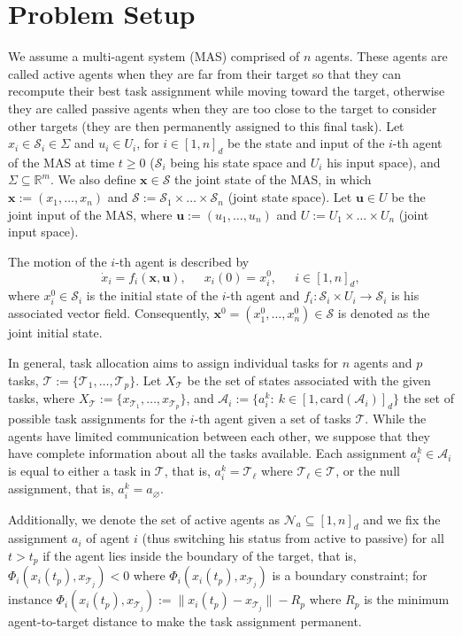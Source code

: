 \documentclass{ifacconf}
\newcommand{\cA}{\mathcal{A}}
\newcommand{\cN}{\mathcal{N}}
\newcommand{\cS}{\mathcal{S}}
\newcommand{\cT}{\mathcal{T}}
\begin{document}
\section{Problem Setup}\label{s:prelim}

We assume a multi-agent system (MAS) comprised of $n$ agents. These agents are called active agents when they are far from their target so that they can recompute their best task assignment while moving toward the target, otherwise they are called passive agents when they are too close to the target to consider other targets (they are then permanently assigned to this final task). Let $x_i \in \cS_i \in \Sigma$ and $u_i \in U_i$, for $i \in [1,n]_d$ be the state and input of the $i$-th agent of the MAS at time $t\geq 0$ ($\cS_i$ being his state space and $U_i$ his input space), and $\Sigma \subseteq \mathbb{R}^m$. We also define $\bm{x} \in \cS$ the joint state of the MAS, in which $\bm{x} := (x_1,\dots,x_n)$ and $\cS:= \cS_1 \times \dots \times \cS_n$ (joint state space). Let $\bm{u} \in U$ be the joint input of the MAS, where $\bm{u} := (u_1, \dots, u_n)$ and $U:= U_1 \times \dots \times U_n$ (joint input space). 

The motion of the $i$-th agent is described by
\begin{equation}\label{eq:motion1}
\dot{x}_i = f_i(\bm{x}, \bm{u}),~\quad~x_i(0)=x_i^0,~\quad~i \in [1, n]_d,
\end{equation}
where $x^0_i \in \cS_i$ is the initial state of the $i$-th agent and $f_i: \cS_i \times U_i \rightarrow \cS_i$ is his associated vector field. 
Consequently, $\bm{x}^0 = (x^0_1, \dots, x^0_n) \in \cS$ is denoted as the joint initial state.




In general, task allocation aims to assign individual tasks for $n$ agents and $p$ tasks, $\cT := \{ \cT_1, \dots, \cT_p\}$. 
Let $X_{\cT}$ be the set of states associated with the given tasks, where $X_{\cT} := \{ x_{\cT_1}, \dots, x_{\cT_p} \}$,
and $\cA_i:= \{ a_i^k:~k\in[1,\mathrm{card}( \cA_i )]_d \}$ the set of possible task assignments for the $i$-th agent given a set of tasks $\cT$. While the agents have limited communication between each other, we suppose that they have complete information about all the tasks available.
Each assignment $a_i^k \in \cA_i$ is equal to either a task in $\cT$, that is, $a_i^k = \cT_\ell$ where $\cT_\ell \in \cT$, or the null assignment, that is, $a_i^k = a_\varnothing$.

Additionally, we denote the set of active agents as $\cN_a \subseteq [1,n]_d$ and we fix the assignment $a_i$ of agent $i$ (thus switching his status from active to passive) for all $t > t_p$ if the agent lies inside the boundary of the target, that is, $\Phi_i( x_i(t_p), x_{\cT_j}) < 0$ where $\Phi_i( x_i(t_p), x_{\cT_j})$ is a boundary constraint; for instance $\Phi_i( x_i(t_p), x_{\cT_j}) := \|x_i(t_p) - x_{\cT_j} \| - R_p$ where $R_p$ is the minimum agent-to-target distance to make the task assignment permanent.
\end{document}
